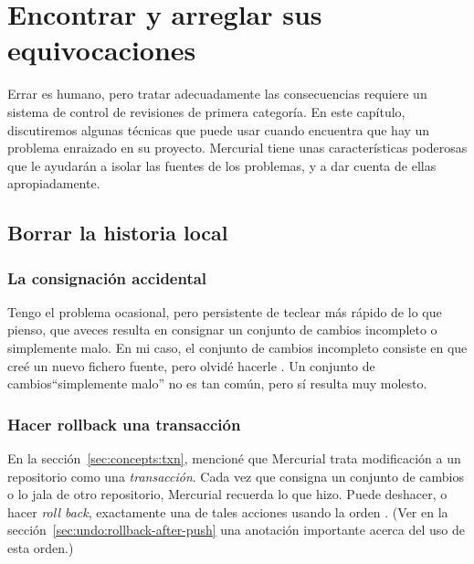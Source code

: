 \chapter{Encontrar y arreglar sus equivocaciones}
\label{chap:undo}

Errar es humano, pero tratar adecuadamente las consecuencias requiere
un sistema de control de revisiones de primera categoría.  En este
capítulo, discutiremos algunas técnicas que puede usar cuando
encuentra que hay un problema enraizado en su proyecto.  Mercurial
tiene unas características poderosas que le ayudarán a isolar las
fuentes de los problemas, y a dar cuenta de ellas apropiadamente.

\section{Borrar la historia local}

\subsection{La consignación accidental}

Tengo el problema ocasional, pero persistente de teclear más rápido de
lo que pienso, que aveces resulta en consignar un conjunto de cambios
incompleto o simplemente malo. En mi caso, el conjunto de cambios
incompleto consiste en que creé un nuevo fichero fuente, pero olvidé
hacerle .  Un conjunto de cambios``simplemente malo'' no es
tan común, pero sí resulta muy molesto.

\subsection{Hacer rollback una transacción}
\label{sec:undo:rollback}

En la sección~\ref{sec:concepts:txn}, mencioné que Mercurial trata
modificación a un repositorio como una \emph{transacción}.  Cada vez
que consigna un conjunto de cambios o lo jala de otro repositorio,
Mercurial recuerda lo que hizo.  Puede deshacer, o hacer \emph{roll back},
exactamente una de tales acciones usando la orden .
(Ver en la sección~\ref{sec:undo:rollback-after-push} una anotación
importante acerca del uso de esta orden.)

